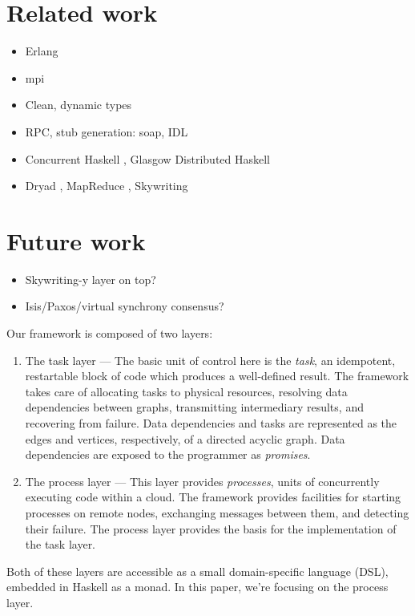 \documentclass[preprint]{sigplanconf}
\begin{document}
\section{Related work}
\begin{itemize}
\item Erlang 
\item mpi 
\item Clean, dynamic types
\item RPC, stub generation: soap, IDL
\item Concurrent Haskell \cite{Parallel2008}, Glasgow Distributed Haskell \cite{gdh2001}
\item Dryad \cite{Dryad2007}, MapReduce \cite{MapReduce2008}, Skywriting \cite{Murray2010}
\end{itemize}

\section{Future work}
\begin{itemize}
\item Skywriting-y layer on top?
\item Isis/Paxos/virtual synchrony consensus?
\end{itemize}

Our framework is composed of two layers:

\begin{enumerate}
\item The task layer --- The basic unit of control here is the {\em task}, an idempotent, restartable block of code which produces a well-defined result. The framework takes care of allocating tasks to physical resources, resolving data dependencies between graphs, transmitting intermediary results, and recovering from failure. Data dependencies and tasks are represented as the edges and vertices, respectively, of a directed acyclic graph. Data dependencies are exposed to the programmer as {\em promises}.
\item The process layer --- This layer provides {\em processes}, units of concurrently executing code within a cloud. The framework provides facilities for starting processes on remote nodes, exchanging messages between them, and detecting their failure. The process layer provides the basis for the implementation of the task layer.
\end{enumerate}

Both of these layers are accessible as a small domain-specific language (DSL), embedded in Haskell as a monad. In this paper, we're focusing on the process layer.
\end{document}
